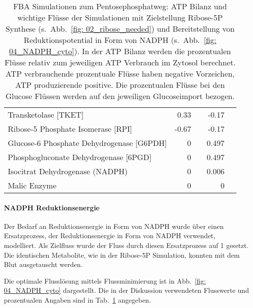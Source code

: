 \begin{table}[!ht]
\begin{minipage}[c]{\textwidth}
\begin{tabular}{l rr rr}
\hspace*{5mm}Transketolase [TKET] & 0.33 &  & -0.17 & \\
\hspace*{5mm}Ribose-5 Phosphate Isomerase [RPI] & -0.67 &  & -0.17 & \\
\hspace*{5mm}Glucose-6 Phosphate Dehydrogenase [G6PDH]& 0 &  & 0.497 & \\
\hspace*{5mm}Phosphogluconate Dehydrogenase [6PGD] & 0 &  & 0.497 & \\
\hspace*{5mm}Isocitrat Dehydrogenase (NADPH) & 0 &  & 0.006 & \\
\hspace*{5mm}Malic Enzyme & 0 &  & 0 & \\
\bottomrule
\end{tabular} 

\normalsize
\label{tab: ribose_nadph}
\caption{FBA Simulationen zum Pentosephosphatweg: ATP Bilanz und wichtige Flüsse der Simulationen mit Zielstellung Ribose-5P Synthese (s.~Abb.~\ref{fig: 02_ribose_needed}) und Bereitstellung von Reduktionspotential in Form von NADPH (s.~Abb.~\ref{fig: 04_NADPH_cyto}). In der ATP Bilanz werden die prozentualen Flüsse relativ zum jeweiligen ATP Verbrauch im Zytosol berechnet. ATP verbrauchende prozentuale Flüsse haben negative Vorzeichen, ATP produzierende positive. Die prozentualen Flüsse bei den Glucose Flüssen werden auf den jeweiligen Glucoseimport bezogen.}
\end{minipage}
\end{table}

\paragraph{NADPH Reduktionsenergie}
Der Bedarf an Reduktionsenergie in Form von NADPH wurde über einen Ersatzprozess, der Reduktionsenergie in Form von NADPH verwendet, modelliert. Als Zielfluss wurde der Fluss durch diesen Ersatzprozess auf 1 gesetzt.
Die identischen Metabolite, wie in der Ribose-5P Simulation, konnten mit dem Blut ausgetauscht werden.

Die optimale Flusslösung mittels Flussminimierung ist in Abb.~\ref{fig: 04_NADPH_cyto} dargestellt. Die in der Diskussion verwendeten Flusswerte und prozentualen Angaben sind in Tab.~\ref{tab: ribose_nadph} angegeben.

